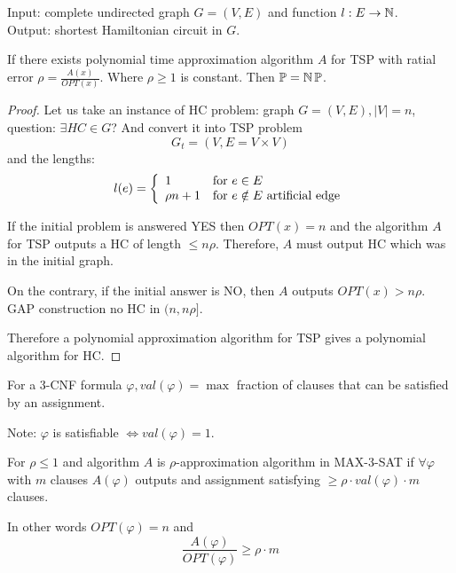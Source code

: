 \begin{example}[TSP]
	Input: complete undirected graph $G = (V, E)$ and function $l:E \to \operatorname{\mathbb{N}}$. \\
	Output: shortest Hamiltonian circuit in $G$.
\end{example}

\begin{lemma}
	If there exists polynomial time approximation algorithm $A$ for TSP with ratial error $\rho = \frac{A(x)}{OPT(x)}$.
	Where $\rho \geq 1$ is constant.
	Then $\operatorname{\mathbb{P}} = \operatorname{\operatorname{\mathbb{N}}\mathbb{P}}$.
\end{lemma}
\begin{proof}
	Let us take an instance of HC problem: graph $G = (V, E), |V| = n$, question: $\exists HC \in G$?
	And convert it into TSP problem
	\[ G_t = (V, E = V \times V) \]
	and the lengths:
	\[ l(e) = \left\{ \begin{array}{ll} 1 & \mbox{for }  e \in E \\  \rho n + 1  & \mbox{for } e \notin E\ \text{artificial edge} \end{array} \right. \]

	If the initial problem is answered YES then $OPT(x) = n$ and the algorithm $A$ for TSP outputs a HC of length $\leq n\rho$.
	Therefore, $A$ must output HC which was in the initial graph.

	On the contrary, if the initial answer is NO, then $A$ outputs $OPT(x) > n \rho$.
	GAP construction no HC in $(n, n \rho]$.

	Therefore a polynomial approximation algorithm for TSP gives a polynomial algorithm for HC.
\end{proof}

\begin{definition}
	For a 3-CNF formula $\varphi, val(\varphi) = \max$ fraction of clauses that can be satisfied by an assignment.

	Note: $\varphi$ is satisfiable $\iff val(\varphi) = 1$.

	For $\rho \leq 1$ and algorithm $A$ is $\rho$-approximation algorithm in MAX-3-SAT if
	$ \forall \varphi $ with $m$ clauses $A(\varphi)$ outputs and assignment satisfying $\geq \rho \cdot val(\varphi) \cdot m$ clauses.

	In other words $OPT(\varphi) = n$ and
	\[ \frac{A(\varphi)}{OPT(\varphi)} \geq \rho \cdot m \]
\end{definition}

